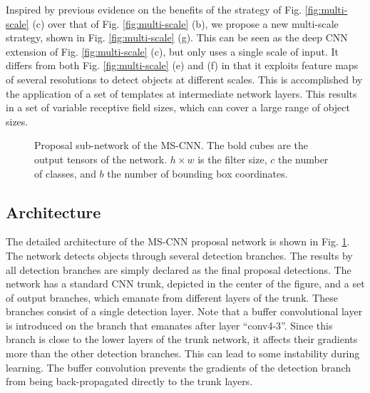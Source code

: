 \documentclass[runningheads]{llncs}
\begin{document}
Inspired by previous evidence  on the benefits of the strategy of
Fig. \ref{fig:multi-scale} (c) over that of
Fig. \ref{fig:multi-scale} (b), we propose a new
multi-scale strategy, shown in Fig. \ref{fig:multi-scale} (g).
This can be seen as the deep CNN  extension of Fig. \ref{fig:multi-scale} (c),
but only uses a single scale of input. It differs from both
Fig. \ref{fig:multi-scale} (e) and (f) in that it exploits feature maps of
several resolutions to detect objects at different scales. This is
accomplished by the application of a set of templates at intermediate
network layers. This results in a set of variable receptive field sizes,
which can cover a large range of object sizes.


\begin{figure}[!t]
\centering
\centerline{}
\caption{Proposal sub-network of the MS-CNN. The bold cubes are the output tensors of the network. $h\times{w}$ is the filter size, $c$ the number of classes, and $b$ the number of bounding box coordinates.}
\label{fig:framework}
\end{figure}


\subsection{Architecture}
\label{subsec:framework}

The detailed architecture of the MS-CNN proposal network is shown in
Fig. \ref{fig:framework}. The network detects objects through several
detection branches. The results by all detection branches are simply declared as the final proposal detections. The network has a standard CNN trunk, depicted in the center of
the figure, and a set of output branches, which emanate from different
layers of the trunk. These branches consist of a single detection
layer. Note that a buffer convolutional layer is introduced on the
branch that emanates after layer ``conv4-3''. Since this branch is close to
the lower layers of the trunk network, it affects their gradients more than
the other detection branches. This can lead to some instability during
learning. The buffer convolution prevents the gradients of the
detection branch from being back-propagated directly to the trunk layers.
\end{document}
